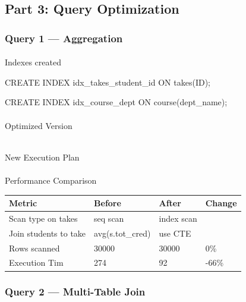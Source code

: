 \documentclass[
  letterpaper,
  DIV=11,
  numbers=noendperiod]{scrartcl}
\makeatletter
\let\oldparagraph\paragraph
\renewcommand{\paragraph}{
    \@ifstar
      \xxxParagraphStar
      \xxxParagraphNoStar
  }
\newcommand{\xxxParagraphStar}[1]{\oldparagraph*{#1}\mbox{}}
\newcommand{\xxxParagraphNoStar}[1]{\oldparagraph{#1}\mbox{}}
\makeatother
\begin{document}
\subsection{Part 3: Query Optimization}\label{part-3-query-optimization}

\subsubsection{Query 1 --- Aggregation}\label{query-1-aggregation-2}

\paragraph{Indexes created}\label{indexes-created}

CREATE INDEX idx\_takes\_student\_id ON takes(ID);

CREATE INDEX idx\_course\_dept ON course(dept\_name);

\paragraph{Optimized Version}\label{optimized-version}

\begin{verbatim}
\end{verbatim}

\paragraph{New Execution Plan}\label{new-execution-plan}

\paragraph{Performance Comparison}\label{performance-comparison}

\begin{longtable}[]{@{}llll@{}}
\toprule\noalign{}
Metric & Before & After & Change \\
\midrule\noalign{}
\endhead
\bottomrule\noalign{}
\endlastfoot
Scan type on takes & seq scan & index scan & \\
Join students to take & avg(s.tot\_cred) & use CTE & \\
Rows scanned & 30000 & 30000 & 0\% \\
Execution Tim & 274 & 92 & -66\% \\
\end{longtable}

\subsubsection{\texorpdfstring{\textbf{Query 2 --- Multi-Table
Join}}{Query 2 --- Multi-Table Join}}\label{query-2-multi-table-join-2}
\end{document}
